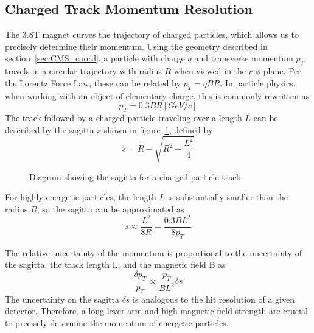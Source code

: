 \subsection{Charged Track Momentum Resolution} \label{sec:CMS_sagitta}
The 3.8\unit{\tesla} magnet curves the trajectory of charged particles, which allows us to precisely determine their momentum. Using the geometry described in section~\ref{sec:CMS_coord}, a particle with charge $q$ and transverse momentum $p_T$ travels in a circular trajectory with radius $R$ when viewed in the $r$-$\phi$ plane. Per the Lorentz Force Law, these can be related by $p_{T} = qBR$. In particle physics, when working with an object of elementary charge, this is commonly rewritten as
\begin{equation}
	\label{eq:pt03br}
	p_{T} = 0.3BR\unit{[GeV/c]}
\end{equation}
The track followed by a charged particle traveling over a length $L$ can be described by the sagitta $s$ shown in figure~\ref{fig:sagitta}, defined by
\begin{equation} \label{eq:sagitta}
	s=R-\sqrt{R^2-\frac{L^2}{4}}
\end{equation}

\begin{figure}[htb!]
	\centering
	\caption{Diagram showing the sagitta for a charged particle track}
	\label{fig:sagitta}
\end{figure}

For highly energetic particles, the length $L$ is substantially smaller than the radius $R$, so the sagitta can be approximated as
\begin{equation} \label{eq:sagitta_approx}
	s\approx\frac{L^2}{8R}=\frac{0.3BL^2}{8p_T}
\end{equation}

The relative uncertainty of the momentum is proportional to the uncertainty of the sagitta, the track length L, and the magnetic field B as
\begin{equation} \label{eq:dptOverpt}
	\frac{\delta p_T}{p_T}\propto\frac{p_T}{BL^2}\delta s
\end{equation}
The uncertainty on the sagitta $\delta s$ is analogous to the hit resolution of a given detector. Therefore, a long lever arm and high magnetic field strength are crucial to precisely determine the momentum of energetic particles.

